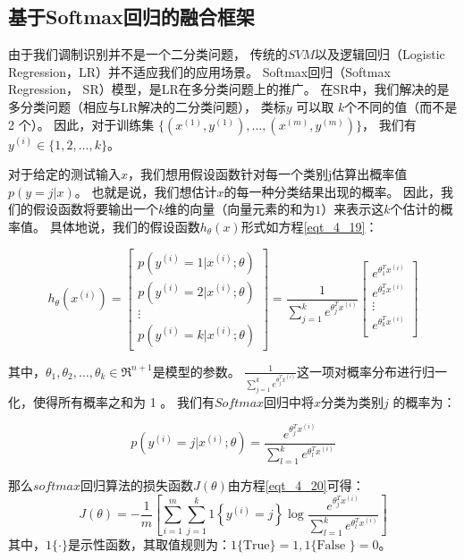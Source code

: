 \subsection{基于Softmax回归的融合框架}

由于我们调制识别并不是一个二分类问题，
传统的$SVM$以及逻辑回归（Logistic Regression，LR）并不适应我们的应用场景。
Softmax回归（Softmax Regression， SR）模型，是LR在多分类问题上的推广。
在SR中，我们解决的是多分类问题（相应与LR解决的二分类问题），
类标$y$ 可以取 $k$个不同的值（而不是 2 个）。
因此，对于训练集 $\{ (x^{(1)}, y^{(1)}), \dots, (x^{(m)}, y^{(m)}) \}$，
我们有$y^{(i)} \in \{1, 2, \dots, k\}$。\par

对于给定的测试输入$x$，我们想用假设函数针对每一个类别j估算出概率值$p(y=j | x)$。
也就是说，我们想估计$x$的每一种分类结果出现的概率。
因此，我们的假设函数将要输出一个$k$维的向量（向量元素的和为$1$）来表示这$k$个估计的概率值。
具体地说，我们的假设函数$h_{\theta}(x)$形式如方程\eqref{eqt_4_19}：

\begin{equation}
\label{eqt_4_19}
		h_\theta(x^{(i)}) =
		\begin{bmatrix}
			p(y^{(i)} = 1 | x^{(i)}; \theta) \\
			p(y^{(i)} = 2 | x^{(i)}; \theta) \\
			\vdots \\
			p(y^{(i)} = k | x^{(i)}; \theta)
		\end{bmatrix}
			=
			\frac{1}{ \sum_{j=1}^{k}{e^{ \theta_j^T x^{(i)} }} }
			\begin{bmatrix}
			e^{ \theta_1^T x^{(i)} } \\
			e^{ \theta_2^T x^{(i)} } \\
			\vdots \\
			e^{ \theta_k^T x^{(i)} } \\
			\end{bmatrix}
\end{equation}

其中，$\theta_1, \theta_2, \ldots, \theta_k \in \Re^{n+1}$是模型的参数。
$\frac{1}{ \sum_{j=1}^{k}{e^{ \theta_j^T x^{(i)} }} }$这一项对概率分布进行归一化，使得所有概率之和为 1 。
我们有$Softmax$回归中将$x$分类为类别$j$ 的概率为：\par
\begin{equation}
p(y^{(i)} = j | x^{(i)} ; \theta) = \frac{e^{\theta_j^T x^{(i)}}}{\sum_{l=1}^k e^{ \theta_l^T x^{(i)}} }
\end{equation}

那么$softmax$回归算法的损失函数$J(\theta)$由方程\eqref{eqt_4_20}可得：
\begin{equation}
	\label{eqt_4_20}
	J(\theta) = - \frac{1}{m} \left[ \sum_{i=1}^{m} \sum_{j=1}^{k}  1\left\{y^{(i)} = j\right\} \log \frac{e^{\theta_j^T x^{(i)}}}{\sum_{l=1}^k e^{ \theta_l^T x^{(i)} }}\right]
\end{equation}
其中，$1\{\cdot\}$是示性函数，其取值规则为：$1\{ \text{True} \}=1, 1\{ \text{False }\}=0$。\par

